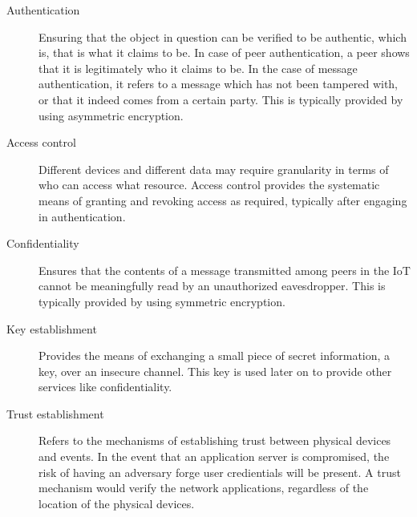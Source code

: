 \documentclass[12pt]{article}
\begin{document}
\begin{description}
\item [Authentication] Ensuring that the object in question can be verified to be authentic, which is, that is what it claims to be. In case of peer authentication, a peer shows that it is legitimately who it claims to be. In the case of message authentication, it refers to a message which has not been tampered with, or that it indeed comes from a certain party. This is typically provided by using asymmetric encryption.
\item [Access control] Different devices and different data may require granularity in terms of who can access what resource. Access control provides the systematic means of granting and revoking access as required, typically after engaging in authentication.
\item [Confidentiality] Ensures that the contents of a message transmitted among peers in the IoT cannot be meaningfully read by an unauthorized eavesdropper. This is typically provided by using symmetric encryption.
\item [Key establishment] Provides the means of exchanging a small piece of secret information, a key, over an insecure channel. This key is used later on to provide other services like confidentiality.
\item [Trust establishment] Refers to the mechanisms of establishing trust between physical devices and events. In the event that an application server is compromised, the risk of having an adversary forge user credientials will be present. A trust mechanism would verify the network applications, regardless of the location of the physical devices. 
\end{description}
\end{document}
